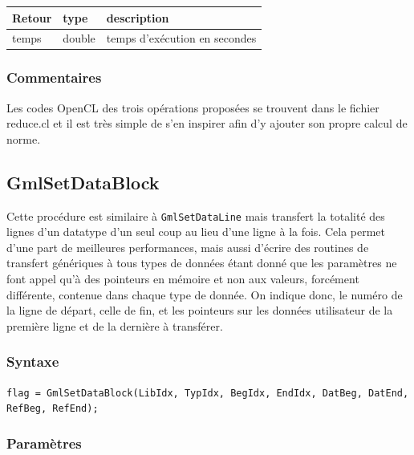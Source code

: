 \documentclass[a4paper,12pt]{article}
\begin{document}
\medskip

\begin{tabular}{|m{2cm}|m{1.5cm}|m{10.5cm}|}
\hline
Retour     & type   & description \\
\hline
temps      & double & temps d'exécution en secondes \\
\hline
\end{tabular}

\subsubsection*{Commentaires}
Les codes OpenCL des trois opérations proposées se trouvent dans le fichier reduce.cl et il est très simple de s'en inspirer afin d'y ajouter son propre calcul de norme.


\subsection{GmlSetDataBlock}

Cette procédure est similaire à {\tt GmlSetDataLine} mais transfert la totalité des lignes d'un datatype d'un seul coup au lieu d'une ligne à la fois. Cela permet d'une part de meilleures performances, mais aussi d'écrire des routines de transfert génériques à tous types de données étant donné que les paramètres ne font appel qu'à des pointeurs en mémoire et non aux valeurs, forcément différente, contenue dans chaque type de donnée.
On indique donc, le numéro de la ligne de départ, celle de fin, et les pointeurs sur les données utilisateur de la première ligne et de la dernière à transférer.

\subsubsection*{Syntaxe}

{\tt flag = GmlSetDataBlock(LibIdx, TypIdx, BegIdx, EndIdx, DatBeg, DatEnd, RefBeg, RefEnd);}

\subsubsection*{Paramètres}
\end{document}
